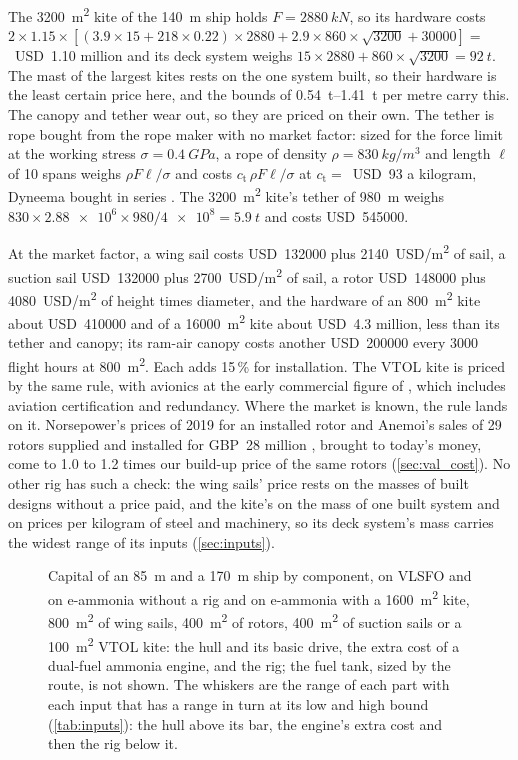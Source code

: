 The \SI{3200}{m^2} kite of the \SI{140}{m} ship holds $F=\SI{2880}{kN}$, so its hardware costs $2\times1.15\times[(3.9\times15 + 218\times0.22)\times2880 + 2.9\times860\times\sqrt{3200} + \num{30000}] =$~USD~1.10 million and its deck system weighs $15\times2880 + 860\times\sqrt{3200} = \SI{92}{t}$. The mast of the largest kites rests on the one system built, so their hardware is the least certain price here, and the bounds of \SIrange{0.54}{1.41}{t} per metre carry this. The canopy and tether wear out, so they are priced on their own. The tether is rope bought from the rope maker with no market factor: sized for the force limit at the working stress $\sigma=\SI{0.4}{GPa}$, a rope of density $\rho=\SI{830}{kg/m^3}$ and length $\ell$ of 10 spans weighs $\rho F\ell/\sigma$ and costs $c_\mathrm{t}\,\rho F\ell/\sigma$ at $c_\mathrm{t}=$~USD~93 a kilogram, Dyneema bought in series \citep[p.~703]{joshi2025}. The \SI{3200}{m^2} kite's tether of \SI{980}{m} weighs $830\times\num{2.88e6}\times980/\num{4e8} = \SI{5.9}{t}$ and costs USD~\num{545000}.

At the market factor, a wing sail costs USD~\num{132000} plus \SI{2140}{USD/m^2} of sail, a suction sail USD~\num{132000} plus \SI{2700}{USD/m^2} of sail, a rotor USD~\num{148000} plus \SI{4080}{USD/m^2} of height times diameter, and the hardware of an \SI{800}{m^2} kite about USD~\num{410000} and of a \SI{16000}{m^2} kite about USD~4.3 million, less than its tether and canopy; its ram-air canopy costs another USD~\num{200000} every \num{3000} flight hours at \SI{800}{m^2}. Each adds 15\,\% for installation. The VTOL kite is priced by the same rule, with avionics at the early commercial figure of \citet{joshi2025}, which includes aviation certification and redundancy.
Where the market is known, the rule lands on it. Norsepower's prices of 2019 for an installed rotor \citep{tillig2020b} and Anemoi's sales of 29 rotors supplied and installed for GBP~28 million \citep{maritimeexec2026anemoi,govuk2026chinavisit}, brought to today's money, come to 1.0 to 1.2 times our build-up price of the same rotors (\cref{sec:val_cost}). No other rig has such a check: the wing sails' price rests on the masses of built designs without a price paid, and the kite's on the mass of one built system and on prices per kilogram of steel and machinery, so its deck system's mass carries the widest range of its inputs (\cref{sec:inputs}).

\begin{figure}[tbp]
\centering
{}
\caption{ Capital of an \SI{85}{m} and a \SI{170}{m} ship by component, on VLSFO and on e-ammonia without a rig and on e-ammonia with a \SI{1600}{m^2} kite, \SI{800}{m^2} of wing sails, \SI{400}{m^2} of rotors, \SI{400}{m^2} of suction sails or a \SI{100}{m^2} VTOL kite: the hull and its basic drive, the extra cost of a dual-fuel ammonia engine, and the rig; the fuel tank, sized by the route, is not shown. The whiskers are the range of each part with each input that has a range in turn at its low and high bound (\cref{tab:inputs}): the hull above its bar, the engine's extra cost and then the rig below it.}
\label{fig:capital}
\end{figure}

